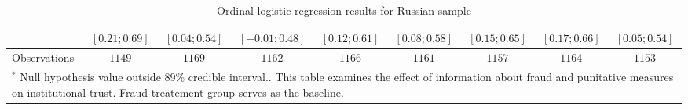 \begin{table}
\begin{center}
\begin{tabular}{l c c c c c c c c}
                    & $ [ 0.21;  0.69]$ & $ [ 0.04;  0.54]$ & $ [-0.01;  0.48]$ & $ [ 0.12;  0.61]$ & $ [ 0.08;  0.58]$ & $ [ 0.15;  0.65]$ & $ [ 0.17;  0.66]$ & $ [ 0.05;  0.54]$ \\
\hline
Observations        & $1149$            & $1169$            & $1162$            & $1166$            & $1161$            & $1157$            & $1164$            & $1153$            \\
\hline
\multicolumn{9}{l}{\scriptsize{$^*$ Null hypothesis value outside 89\% credible interval..  This table examines the effect of information about fraud and punitative measures on institutional trust. Fraud treatement group serves as the baseline.}}
\end{tabular}
\caption{Ordinal logistic regression results for Russian sample}
\label{table:coefficients}
\end{center}
\end{table}
